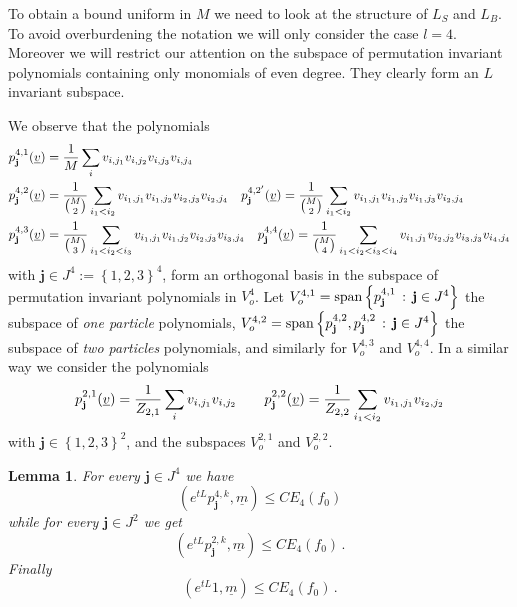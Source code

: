 \documentclass{article}
\def\red{}
\newcommand\set[1]{\left\{ #1 \right\}}
\newcommand\uv{{\underline v}}
\newtheorem{mylemma}[mythm]{Lemma}
\begin{document}
To obtain a bound uniform in $M$ we need to look at the structure of $L_S$ and $L_B$. To avoid overburdening the
notation we will only consider the case $l=4$. Moreover we will restrict our attention on the subspace of
permutation invariant polynomials containing only monomials of even degree. They clearly form an $L$ invariant subspace.

We observe that the polynomials
\[
\begin{aligned}
&p_{\bf j}^{4,1}(\uv)=\frac{1}{M}\sum_{i} v_{i,j_1}v_{i,j_2}v_{i,j_3}v_{i,j_4}\\ 
&p_{\bf j}^{4,2}(\uv)=\frac{1}{\binom M 2}\sum_{i_1<i_2}  v_{i_1,j_1}v_{i_1,j_2}v_{i_2,j_3}v_{i_2,j_4}\quad
p_{\bf j}^{4,2'}(\uv)=\frac{1}{\binom M 2}\sum_{i_1<i_2}  v_{i_1,j_1}v_{i_1,j_2}v_{i_1,j_3}v_{i_2,j_4}\\
&p_{\bf j}^{4,3}(\uv)=\frac{1}{\binom M 3}\sum_{i_1<i_2<i_3}  v_{i_1,j_1}v_{i_1,j_2}v_{i_2,j_3}v_{i_3,j_4}\quad
p_{\bf j}^{4,4}(\uv)=\frac{1}{\binom M 4}\sum_{i_1 < i_2 < i_3 < i_4}  v_{i_1,j_1}v_{i_2,j_2}v_{i_3,j_3}v_{i_4,j_4}
\end{aligned}
\]
with $\mathbf j\in J^4:=\set{1,2,3}^4$, form an orthogonal basis in the subspace of permutation invariant polynomials in
$V^4_o$. Let $V^{4,1}_o=\mathrm{span}\set{p_{\bf j}^{4,1}\, :\,\mathbf j\in J^4}$ the
subspace of {\it one particle} polynomials, $V^{4,2}_o=\mathrm{span}\set{p_{\bf j}^{4,2}, p_{\bf j}^{4,2}\, :\, \mathbf
	j\in J^4}$ the subspace of {\it two particles} polynomials, and similarly for $V^{4,3}_o$ and $V^{4,4}_o$. 
	In a
similar way we consider the polynomials
\[
p_{\bf j}^{2,1}(\uv)=\frac{1}{Z_{2,1}}\sum_{i} v_{i,j_1}v_{i,j_2}\qquad 
p_{\bf j}^{2,2}(\uv)=\frac{1}{Z_{2,2}}\sum_{i_1<i_2} v_{i_1,j_1}v_{i_2,j_2} 
\]
with $\mathbf j\in\set{1,2,3}^2$, and the subspaces $V^{2,1}_o$ and $V^{2,2}_o$.
\red{
\begin{mylemma}\label{lem:lemref}
For every $\mathbf j\in J^4$ we have
\begin{equation}\label{eq:lemref1}
(e^{t L}p_{\mathbf j}^{4,k},\underline m)\leq CE_4(f_0)
\end{equation}
while for every $\mathbf j\in J^2$ we get
\begin{equation}\label{eq:lemref2}
(e^{t L}p_{\mathbf j}^{2,k},\underline m)\leq CE_4(f_0)\, .
\end{equation}
Finally
\begin{equation}\label{eq:lemref3}
(e^{t L}1,\underline m)\leq CE_4(f_0)\, .
\end{equation}
\end{mylemma}}
\end{document}
